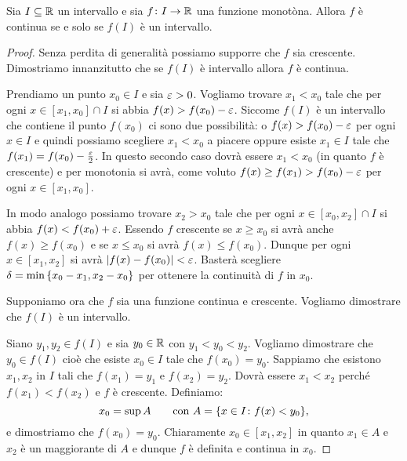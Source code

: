   
  \begin{theorem}
    \label{th:monotona_continua}%
    \mymark{*}%
    Sia $I\subseteq {\mathbb R}$ un intervallo e sia
    $f\colon I \to {\mathbb R}$ una funzione monotòna.
    Allora $f$ è continua se e solo se $f(I)$ è 
    un intervallo.
  \end{theorem}
  \begin{proof}
  Senza perdita di generalità possiamo supporre che $f$ 
  sia crescente. 
  Dimostriamo innanzitutto che se $f(I)$ è intervallo allora $f$ è continua.
  
  Prendiamo un punto $x_0\in I$ e sia $\varepsilon>0$.
  Vogliamo trovare $x_1<x_0$ tale che  
  per ogni $x\in [x_1,x_0]\cap I$ si abbia $f(x)>f(x_0)-\varepsilon$.
  Siccome $f(I)$ è un intervallo che contiene il punto $f(x_0)$ 
  ci sono due possibilità: o $f(x)>f(x_0)-\varepsilon$ per ogni $x\in I$
  e quindi possiamo scegliere $x_1<x_0$ a piacere
  oppure esiste $x_1\in I$ tale che $f(x_1)=f(x_0) - \frac {\varepsilon} 2$.
  In questo secondo caso dovrà essere $x_1<x_0$ (in quanto $f$ è crescente)
  e per monotonia si avrà, come voluto $f(x)\ge f(x_1) > f(x_0)-\varepsilon$ 
  per ogni $x\in [x_1,x_0]$.
  
  In modo analogo possiamo trovare $x_2>x_0$ tale 
  che per ogni $x\in [x_0,x_2]\cap I$ si abbia $f(x) < f(x_0)+\varepsilon$.
  Essendo $f$ crescente se $x\ge x_0$ si avrà anche $f(x)\ge f(x_0)$ 
  e se $x\le x_0$ si avrà $f(x) \le f(x_0)$. 
  Dunque per ogni $x\in [x_1,x_2]$ si avrà ${\left|f(x)-f(x_0)\right|}<\varepsilon$.
  Basterà scegliere $\delta = \min{\left\{ x_0-x_1,x_2-x_0 \right\}}$ 
  per ottenere la continuità di $f$ in $x_0$.
  
  Supponiamo ora che $f$ sia una funzione continua e crescente.
  Vogliamo dimostrare che $f(I)$ è un intervallo.
  
  Siano $y_1, y_2 \in f(I)$ e sia $y_0\in {\mathbb R}$
  con $y_1 < y_0 < y_2$.
  Vogliamo dimostrare che $y_0\in f(I)$ cioè che esiste $x_0\in I$
  tale che $f(x_0)=y_0$.
  Sappiamo che esistono $x_1,x_2$ in $I$ tali che
  $f(x_1) = y_1$ e $f(x_2) = y_2$.
  Dovrà essere $x_1<x_2$ perché $f(x_1)<f(x_2)$ e
  $f$ è crescente.
  Definiamo:
  \[
   x_0 = \sup A
  \qquad
  \text{con } A={\left\{ x\in I\colon f(x)<y_0 \right\}},
  \]
  e dimostriamo che $f(x_0)=y_0$. 
  Chiaramente $x_0\in [x_1,x_2]$ in quanto 
  $x_1\in A$ e $x_2$ è un maggiorante di $A$
  e dunque $f$ è definita e continua in $x_0$.
  

\end{proof}
